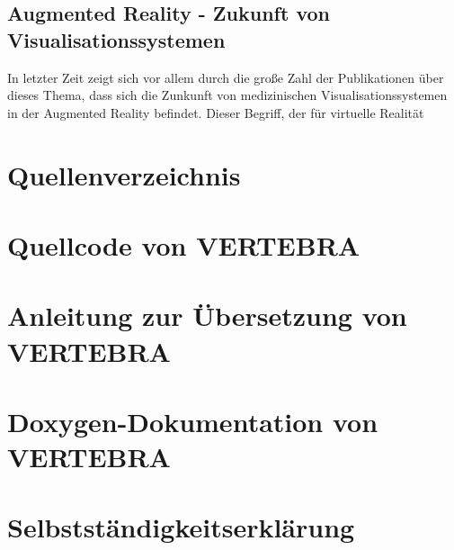 \documentclass[a4paper]{scrartcl}
\begin{document}
\subsection{Augmented Reality - Zukunft von Visualisationssystemen}
In letzter Zeit zeigt sich vor allem durch die große Zahl der Publikationen über dieses Thema, dass sich die Zunkunft von medizinischen
Visualisationssystemen in der Augmented Reality befindet. Dieser Begriff, der für virtuelle Realität \cite{Botden2009}
\appendix
\section{Quellenverzeichnis}
\section{Quellcode von VERTEBRA}
\section{Anleitung zur Übersetzung von VERTEBRA}
\section{Doxygen-Dokumentation von VERTEBRA}
\section{Selbstständigkeitserklärung}


\end{document}
